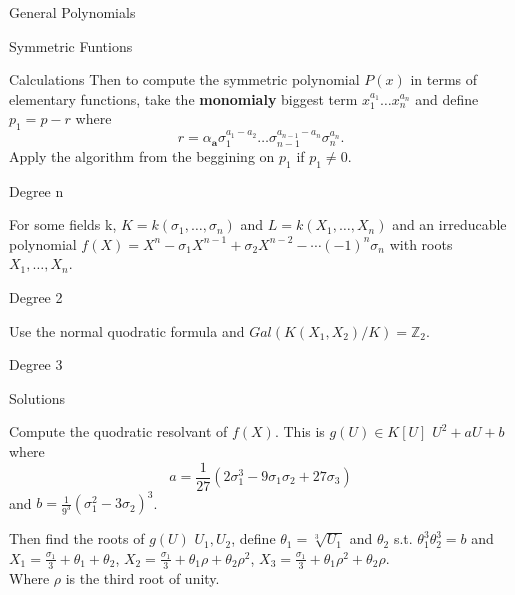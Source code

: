 \documentclass[12pt, letterpaper]{article}
\newcommand{\Z}{\mathbb{Z}}
\begin{document}
\begin{section}{General Polynomials}
\begin{subsection}{Symmetric Funtions}
\begin{subsubsection}{Calculations}
      Then to compute the symmetric polynomial \(P(x)\) in terms of elementary
      functions, take the \textbf{monomialy} biggest term
      \(x^{a_{1}}_{1} \dots x^{a_{n}}_{n}\) and define \(p_{1} = p - r\) where
      \[r = \alpha_{\textbf{a}} \sigma^{a_{1} - a_{2}}_{1} \dots
        \sigma^{a_{n - 1} - a_{n}}_{n - 1} \sigma^{a_{n}}_{n}.\]
      Apply the algorithm from the beggining on \(p_{1}\) if \(p_{1} \neq 0\).

    \end{subsubsection}

  \end{subsection}

  \begin{subsection}{Degree n}

    For some fields k, \(K = k(\sigma_{1}, \dots , \sigma_{n})\) and
    \(L = k(X_{1}, \dots , X_{n})\) and an irreducable polynomial \(f(X) =
    X^{n} - \sigma_{1} X^{n - 1} + \sigma_{2} X^{n - 2} - \cdots (-1)^{n} \sigma_{n}\)
    with roots \(X_{1}, \dots , X_{n}\).

  \end{subsection}

  \begin{subsection}{Degree 2}

    Use the normal quodratic formula and \(Gal(K(X_{1}, X_{2}) / K) = \Z_{2}\).

  \end{subsection}

  \begin{subsection}{Degree 3}

    \begin{subsubsection}{Solutions}

      Compute the quodratic resolvant of \(f(X)\). This is \(g(U) \in K[U]\)
      \(U^{2} + aU + b\) where \[a = \frac{1}{27} (2 \sigma^{3}_{1} -
        9 \sigma_{1} \sigma_{2} + 27 \sigma_{3})\] and \(b = \frac{1}{9^{3}}
      (\sigma^{2}_{1} - 3 \sigma_{2})^{3}\).

      Then find the roots of \(g(U)\) \(U_{1}, U_{2}\), define
      \(\theta_{1} = \sqrt[3]{U_{1}}\) and \(\theta_{2}\) s.t.
      \(\theta^{3}_{1} \theta^{3}_{2} = b\) and
      \(X_{1} = \frac{\sigma_{1}}{3} + \theta_{1} + \theta_{2}\),
      \(X_{2} = \frac{\sigma_{1}}{3} + \theta_{1} \rho + \theta_{2} \rho^{2}\),
      \(X_{3} = \frac{\sigma_{1}}{3} + \theta_{1} \rho^{2} + \theta_{2} \rho\).
      \\
      Where \(\rho\) is the third root of unity.


\end{subsubsection}
\end{subsection}
\end{section}
\end{document}
